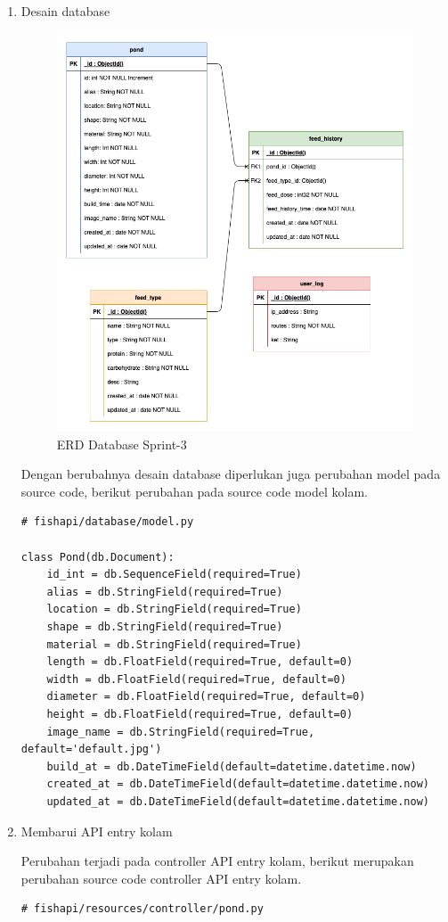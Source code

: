 \begin{enumerate}[1.]

\item Desain database
\begin{figure}[H]
	\centering
	\includegraphics[height=0.7\textwidth]{gambar/Sprint03/diagram database/database}
	\caption{ERD Database Sprint-3}
	\label{fig:database_sprint3}
\end{figure}

Dengan berubahnya desain database diperlukan juga perubahan model pada source code, berikut perubahan pada source code model kolam.

\begin{lstlisting}
# fishapi/database/model.py

class Pond(db.Document):
    id_int = db.SequenceField(required=True)
    alias = db.StringField(required=True)
    location = db.StringField(required=True)
    shape = db.StringField(required=True)
    material = db.StringField(required=True)
    length = db.FloatField(required=True, default=0)
    width = db.FloatField(required=True, default=0)
    diameter = db.FloatField(required=True, default=0)
    height = db.FloatField(required=True, default=0)
    image_name = db.StringField(required=True, default='default.jpg')
    build_at = db.DateTimeField(default=datetime.datetime.now)
    created_at = db.DateTimeField(default=datetime.datetime.now)
    updated_at = db.DateTimeField(default=datetime.datetime.now)
\end{lstlisting}

\item Membarui API entry kolam

Perubahan terjadi pada controller API entry kolam, berikut merupakan perubahan source code controller API entry kolam.
\begin{lstlisting}
# fishapi/resources/controller/pond.py


\end{lstlisting}
\end{enumerate}
